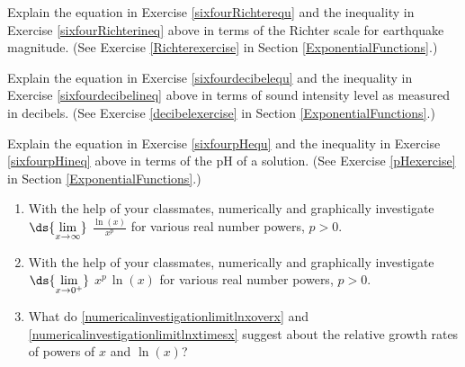 \documentclass{ximera}
\begin{document}
\begin{problem}
Explain the equation in Exercise \ref{sixfourRichterequ} and the inequality in Exercise \ref{sixfourRichterineq} above in terms of the Richter scale for earthquake magnitude.  (See Exercise \ref{Richterexercise} in Section \ref{ExponentialFunctions}.)    
\end{problem}

\begin{problem}
Explain the equation in Exercise \ref{sixfourdecibelequ} and the inequality in Exercise \ref{sixfourdecibelineq} above in terms of sound intensity level as measured in decibels.  (See Exercise \ref{decibelexercise} in Section \ref{ExponentialFunctions}.)   
\end{problem}

\begin{problem}
Explain the equation in Exercise \ref{sixfourpHequ} and the inequality in Exercise \ref{sixfourpHineq} above in terms of the pH of a solution.  (See Exercise \ref{pHexercise} in Section \ref{ExponentialFunctions}.)
\end{problem}

\begin{problem}\label{powerloggrowthex} 
\begin{enumerate} \item\label{numericalinvestigationlimitlnxoverx} With the help of your classmates, numerically and graphically investigate $\ds{\lim_{x \rightarrow \infty}}$ $\frac{\ln(x)}{x^{p}}$ for various real number powers, $p > 0$.

 \item\label{numericalinvestigationlimitlnxtimesx} With the help of your classmates, numerically and graphically investigate $\ds{\lim_{x \rightarrow 0^{+}}}$ $x^{p} \, \ln(x) $ for various real number powers, $p > 0$.

\item  What do \ref{numericalinvestigationlimitlnxoverx} and \ref{numericalinvestigationlimitlnxtimesx} suggest about the relative growth rates of powers of $x$ and $\ln(x)$?

\end{enumerate}
\end{problem}
\end{document}

